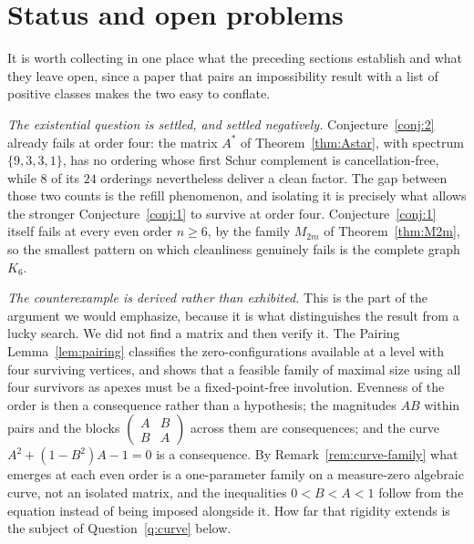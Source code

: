 \documentclass[11pt]{article}
\theoremstyle{plain}
\theoremstyle{definition}
\begin{document}
\section{Status and open problems}\label{sec:status}
\begin{humanblock}
It is worth collecting in one place what the preceding sections establish and what they leave open,
since a paper that pairs an impossibility result with a list of positive classes makes the two easy to
conflate.

\emph{The existential question is settled, and settled negatively.} Conjecture~\ref{conj:2} already
fails at order four: the matrix $A^*$ of Theorem~\ref{thm:Astar}, with spectrum $\{9,3,3,1\}$, has no
ordering whose first Schur complement is cancellation-free, while $8$ of its $24$ orderings
nevertheless deliver a clean factor. The gap between those two counts is the refill phenomenon, and
isolating it is precisely what allows the stronger Conjecture~\ref{conj:1} to survive at order four.
Conjecture~\ref{conj:1} itself fails at every even order $n\ge6$, by the family $M_{2m}$ of
Theorem~\ref{thm:M2m}, so the smallest pattern on which cleanliness genuinely fails is the complete
graph $K_6$.

\emph{The counterexample is derived rather than exhibited.} This is the part of the argument we would
emphasize, because it is what distinguishes the result from a lucky search. We did not find a matrix
and then verify it. The Pairing Lemma~\ref{lem:pairing} classifies the zero-configurations available at
a level with four surviving vertices, and shows that a feasible family of maximal size using all four
survivors as apexes must be a fixed-point-free involution. Evenness of the order is then a consequence
rather than a hypothesis; the magnitudes $AB$ within pairs and the blocks
$\begin{pmatrix}A&B\\B&A\end{pmatrix}$ across them are consequences; and the curve
$A^2+(1-B^2)A-1=0$ is a consequence. By Remark~\ref{rem:curve-family} what emerges at each even order
is a one-parameter family on a measure-zero algebraic curve, not an isolated matrix, and the
inequalities $0<B<A<1$ follow from the equation instead of being imposed alongside it. How far that
rigidity extends is the subject of Question~\ref{q:curve} below.


\end{humanblock}
\end{document}
